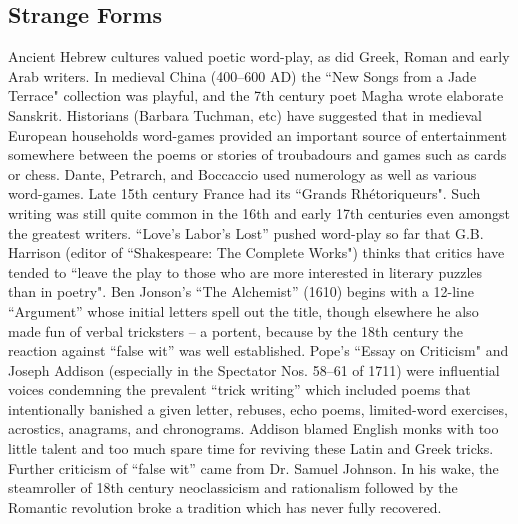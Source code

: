 \documentclass[11pt]{article}
\begin{document}
\newpage\subsection{Strange Forms}
Ancient Hebrew cultures valued poetic word-play, as did Greek, Roman and early Arab writers. In medieval China (400–600 AD) the “New Songs from a Jade Terrace" collection was playful, and the 7th century poet Magha wrote elaborate Sanskrit. Historians (Barbara Tuchman, etc) have suggested that in medieval European households word-games provided an important source of entertainment somewhere between the poems or stories of troubadours and games such as cards or chess. Dante, Petrarch, and Boccaccio used numerology as well as various word-games. Late 15th century France had its “Grands Rhétoriqueurs". Such writing was still quite common in the 16th and early 17th centuries even amongst the greatest writers. “Love's Labor's Lost” pushed word-play so far that G.B. Harrison (editor of “Shakespeare: The Complete Works") thinks that critics have tended to “leave the play to those who are more interested in literary puzzles than in poetry". Ben Jonson's “The Alchemist” (1610) begins with a 12-line “Argument” whose initial letters spell out the title, though elsewhere he also made fun of verbal tricksters – a portent, because by the 18th century the reaction against “false wit” was well established. Pope's “Essay on Criticism" and Joseph Addison (especially in the Spectator Nos. 58–61 of 1711) were influential voices condemning the prevalent “trick writing” which included poems that intentionally banished a given letter, rebuses, echo poems, limited-word exercises, acrostics, anagrams, and chronograms. Addison blamed English monks with too little talent and too much spare time for reviving these Latin and Greek tricks. Further criticism of “false wit” came from Dr. Samuel Johnson. In his wake, the steamroller of 18th century neoclassicism and rationalism followed by the Romantic revolution broke a tradition which has never fully recovered.
\end{document}

